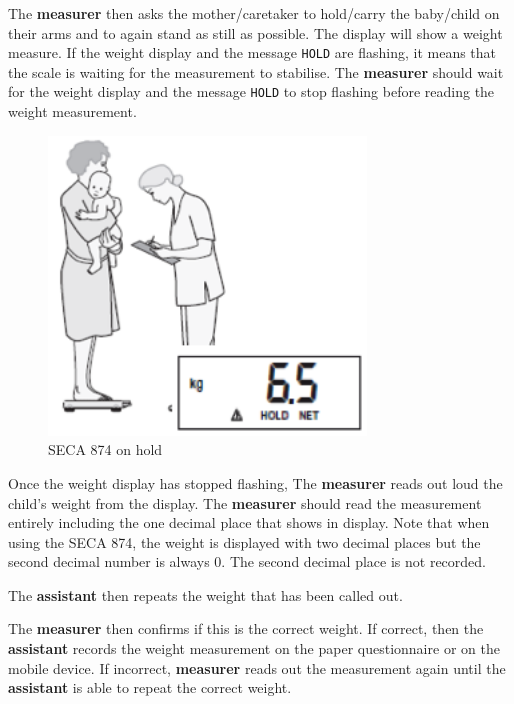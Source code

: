 \documentclass[12pt,]{book}
\theoremstyle{definition}
\theoremstyle{definition}
\theoremstyle{definition}
\theoremstyle{remark}
\begin{document}
The \textbf{measurer} then asks the mother/caretaker to hold/carry the
baby/child on their arms and to again stand as still as possible. The
display will show a weight measure. If the weight display and the
message \texttt{HOLD} are flashing, it means that the scale is waiting
for the measurement to stabilise. The \textbf{measurer} should wait for
the weight display and the message \texttt{HOLD} to stop flashing before
reading the weight measurement.

\begin{figure}

{\centering \includegraphics[width=3.32in]{images/seca874hold} 

}

\caption{SECA 874 on hold}\label{fig:weight12}
\end{figure}

Once the weight display has stopped flashing, The \textbf{measurer}
reads out loud the child's weight from the display. The
\textbf{measurer} should read the measurement entirely including the one
decimal place that shows in display. Note that when using the SECA 874,
the weight is displayed with two decimal places but the second decimal
number is always 0. The second decimal place is not recorded.

The \textbf{assistant} then repeats the weight that has been called out.

The \textbf{measurer} then confirms if this is the correct weight. If
correct, then the \textbf{assistant} records the weight measurement on
the paper questionnaire or on the mobile device. If incorrect,
\textbf{measurer} reads out the measurement again until the
\textbf{assistant} is able to repeat the correct weight.

~
\end{document}
